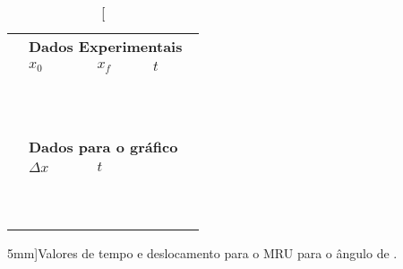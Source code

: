 \begin{table*}[!ht]
\centering
\begin{tabular}{lp{25mm}p{25mm}p{25mm}l}
\toprule
	&\multicolumn{4}{l}{\textbf{Dados Experimentais}} \\
	\cmidrule{2-4}
	& $x_0$ & $x_f$ & $t$ &\\
	\cmidrule{2-4}
	& \cellcolor[gray]{0.89} & \cellcolor[gray]{0.92} & \cellcolor[gray]{0.89} \\
	& \cellcolor[gray]{0.95} & \cellcolor[gray]{0.97} & \cellcolor[gray]{0.95} \\
	& \cellcolor[gray]{0.89} & \cellcolor[gray]{0.92} & \cellcolor[gray]{0.89} \\
	& \cellcolor[gray]{0.95} & \cellcolor[gray]{0.97} & \cellcolor[gray]{0.95} \\
	& \cellcolor[gray]{0.89} & \cellcolor[gray]{0.92} & \cellcolor[gray]{0.89} \\
	& \cellcolor[gray]{0.95} & \cellcolor[gray]{0.97} & \cellcolor[gray]{0.95} \\
	& \cellcolor[gray]{0.89} & \cellcolor[gray]{0.92} & \cellcolor[gray]{0.89} \\
	& \cellcolor[gray]{0.95} & \cellcolor[gray]{0.97} & \cellcolor[gray]{0.95} \\
	& \cellcolor[gray]{0.89} & \cellcolor[gray]{0.92} & \cellcolor[gray]{0.89} \\
	& \cellcolor[gray]{0.95} & \cellcolor[gray]{0.97} & \cellcolor[gray]{0.95} \\
	\cmidrule{2-4}
\\
	& \multicolumn{3}{l}{\textbf{Dados para o gráfico}} \\
	\cmidrule{2-3}
	& $\Delta x$ & $t$ \\
	\cmidrule{2-3}
	& \cellcolor[gray]{0.89} & \cellcolor[gray]{0.92} \\ 
	& \cellcolor[gray]{0.95} & \cellcolor[gray]{0.97} \\ 
	& \cellcolor[gray]{0.89} & \cellcolor[gray]{0.92} \\ 
	& \cellcolor[gray]{0.95} & \cellcolor[gray]{0.97} \\ 
	& \cellcolor[gray]{0.89} & \cellcolor[gray]{0.92} \\ 
	& \cellcolor[gray]{0.95} & \cellcolor[gray]{0.97} \\ 
	& \cellcolor[gray]{0.89} & \cellcolor[gray]{0.92} \\ 
	& \cellcolor[gray]{0.95} & \cellcolor[gray]{0.97} \\ 
	& \cellcolor[gray]{0.89} & \cellcolor[gray]{0.92} \\ 
	& \cellcolor[gray]{0.95} & \cellcolor[gray]{0.97} \\ 
	\cmidrule{2-3}
\bottomrule
\end{tabular}
\caption[][5mm]{Valores de tempo e deslocamento para o MRU para o ângulo de .}
\label{DadosMRU}
\end{table*}


